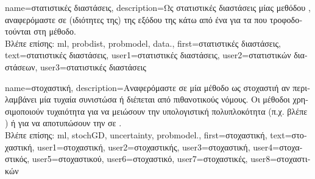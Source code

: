 {name={\foreignlanguage{greek}{στατιστικές διαστάσεις}}, 
	description={\foreignlanguage{greek}{Ως στατιστικές διαστάσεις μίας μεθόδου} 
		, \foreignlanguage{greek}{αναφερόμαστε σε (ιδιότητες της)}  \foreignlanguage{greek}{της 
		εξόδου της κάτω από ένα}  \foreignlanguage{greek}{για τα}  
		\foreignlanguage{greek}{που τροφοδοτούνται στη μέθοδο.} \\
		\foreignlanguage{greek}{Βλέπε επίσης:} \gls{ml}, \gls{probdist}, \gls{probmodel}, \gls{data}.},
	first={\foreignlanguage{greek}{στατιστικές διαστάσεις}},
	text={\foreignlanguage{greek}{στατιστικές διαστάσεις}},
	user1={\foreignlanguage{greek}{στατιστικές διαστάσεις}}, %
	user2={\foreignlanguage{greek}{στατιστικών διαστάσεων}}, %
	user3={\foreignlanguage{greek}{στατιστικές διαστάσεις}} %
}

{name={\foreignlanguage{greek}{στοχαστική}},
	description={\foreignlanguage{greek}{Αναφερόμαστε σε μία μέθοδο ως στοχαστιή} 
		\foreignlanguage{greek}{αν περιλαμβάνει μία τυχαία συνιστώσα ή διέπεται από πιθανοτικούς 
		νόμους. Οι μέθοδοι}  \foreignlanguage{greek}{χρησιμοποιούν τυχαιότητα για να 
		μειώσουν την υπολογιστική πολυπλοκότητα (π.χ. βλέπε} ) 
		\foreignlanguage{greek}{ή για να αποτυπώσουν την}  
		\foreignlanguage{greek}{σε} . \\
		\foreignlanguage{greek}{Βλέπε επίσης:} \gls{ml}, \gls{stochGD}, \gls{uncertainty}, \gls{probmodel}.},
	first={\foreignlanguage{greek}{στοχαστική}},
	text={\foreignlanguage{greek}{στοχαστική}}, 
	user1={\foreignlanguage{greek}{στοχαστική}}, %
	user2={\foreignlanguage{greek}{στοχαστικής}}, %
	user3={\foreignlanguage{greek}{στοχαστική}}, %
	user4={\foreignlanguage{greek}{στοχαστικός}}, %
	user5={\foreignlanguage{greek}{στοχαστικού}}, %
	user6={\foreignlanguage{greek}{στοχαστικό}}, %
	user7={\foreignlanguage{greek}{στοχαστικές}}, %
	user8={\foreignlanguage{greek}{στοχαστικών}} %
}

